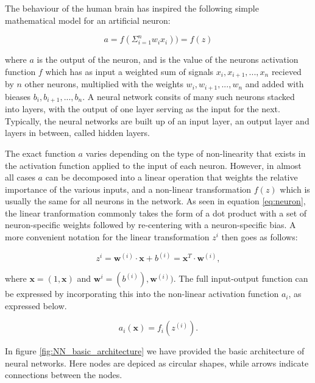 \documentclass[a4paper, UKenglish, 11pt]{uiomaster}
\begin{document}
The behaviour of the human brain has inspired the following simple mathematical model for an artificial neuron:

\begin{equation}
  a = f \left( \Sigma_{i=1}^n w_ix_i \right) ) = f(z)
\label{eq:neuron}
\end{equation}

where $a$ is the output of the neuron, and is the value of the neurons activation function $f$ which has as input a weighted sum of signals $x_i, x_{i+1},...,x_n$ recieved by $n$ other neurons, multiplied with the weights $w_i, w_{i+1}, ..., w_{n}$ and added with bieases $b_i, b_{i+1}, ..., b_{n}$.  A neural network consits of many such neurons stacked into layers, with the output of one layer serving as the input for the next. Typically, the neural networks are built up of an input layer, an output layer and layers in between, called hidden layers.

The exact function $a$ varies depending on the type of non-linearity that exists in the activation function applied to the input of each neuron. However, in almost all cases $a$ can be decomposed into a linear operation that weights the relative importance of the various inputs, and a non-linear transformation $f(z)$ which is usually the same for all neurons in the network. As seen in equation \ref{eq:neuron}, the linear tranformation commonly takes the form of a dot product with a set of neuron-specific weights followed by re-centering with a neuron-specific bias. A more convenient notation for the linear transformation $z^{i}$ then goes as follows:

\begin{equation}
z^{i} = \boldsymbol{w}^{(i)} \cdot \boldsymbol{x} + b^{(i)} = \mathbf{x}^T \cdot \mathbf{w}^{(i)} ,
\label{eq:linear_transformation}
\end{equation}


where $\mathbf{x} = (1, \boldsymbol{x})$ and $\mathbf{w}^i = (b^{(i)}), \boldsymbol{w}^{(i)})$. The full input-output function can be expressed by incorporating this into the non-linear activation function $a_i$, as expressed below.

\begin{equation}
a_i(\mathbf{x}) = f_i(z^{(i)}) .
\label{eq:linear_transformation}
\end{equation}

In figure \ref{fig:NN_basic_architecture} we have provided the basic architecture of neural networks. Here nodes are depiced as circular shapes, while arrows indicate connections between the nodes.
\end{document}
